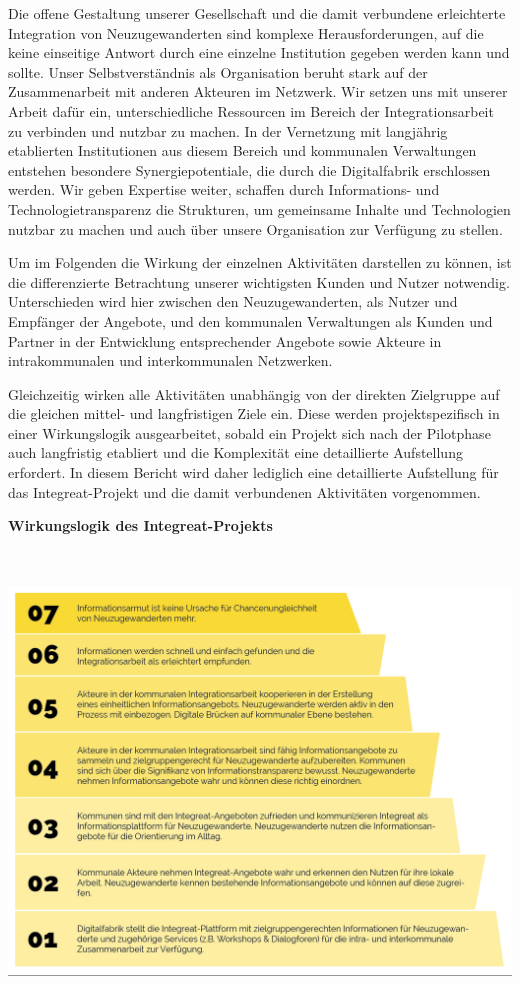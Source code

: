 \documentclass[12pt, a4paper]{article} %
\begin{document}
Die offene Gestaltung unserer Gesellschaft und die damit verbundene
erleichterte Integration von Neuzugewanderten sind komplexe
Herausforderungen, auf die keine einseitige Antwort durch eine einzelne
Institution gegeben werden kann und sollte. Unser Selbstverständnis als
Organisation beruht stark auf der Zusammenarbeit mit anderen Akteuren im
Netzwerk. Wir setzen uns mit unserer Arbeit dafür ein, unterschiedliche
Ressourcen im Bereich der Integrationsarbeit zu verbinden und nutzbar zu
machen. In der Vernetzung mit langjährig etablierten Institutionen aus
diesem Bereich und kommunalen Verwaltungen entstehen besondere
Synergiepotentiale, die durch die Digitalfabrik erschlossen werden. Wir
geben Expertise weiter, schaffen durch Informations- und
Technologietransparenz die Strukturen, um gemeinsame Inhalte und
Technologien nutzbar zu machen und auch über unsere Organisation zur
Verfügung zu stellen.

Um im Folgenden die Wirkung der einzelnen Aktivitäten darstellen zu
können, ist die differenzierte Betrachtung unserer wichtigsten Kunden
und Nutzer notwendig. Unterschieden wird hier zwischen den
Neuzugewanderten, als Nutzer und Empfänger der Angebote, und den
kommunalen Verwaltungen als Kunden und Partner in der Entwicklung
entsprechender Angebote sowie Akteure in intrakommunalen und
interkommunalen Netzwerken.

Gleichzeitig wirken alle Aktivitäten unabhängig von der direkten
Zielgruppe auf die gleichen mittel- und langfristigen Ziele ein. Diese
werden projektspezifisch in einer Wirkungslogik ausgearbeitet, sobald
ein Projekt sich nach der Pilotphase auch langfristig etabliert und die
Komplexität eine detaillierte Aufstellung erfordert. In diesem Bericht
wird daher lediglich eine detaillierte Aufstellung für das
Integreat-Projekt und die damit verbundenen Aktivitäten vorgenommen.


\begin{minipage}[t]{\textwidth}
    \textbf{Wirkungslogik des Integreat-Projekts}

    \includegraphics[width=6.3in,height=4.8125in]{./media/image2.png}
\end{minipage}
\end{document}
